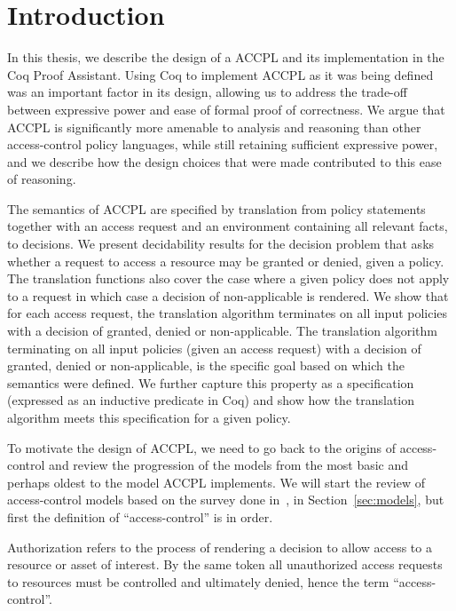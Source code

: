 \chapter{Introduction}
\label{chap:intro}

In this thesis, we describe the design of a \ac{ACCPL} and its implementation in the Coq Proof Assistant. Using Coq to implement \ac{ACCPL} as it was being defined was an important factor in its design, allowing us to address the trade-off between expressive power and ease of formal proof of correctness. We argue that \ac{ACCPL} is significantly more amenable to analysis and reasoning than other access-control policy languages, while still retaining sufficient expressive power, and we describe how the design choices that were made contributed to this ease of reasoning. 

The semantics of \ac{ACCPL} are specified by translation from policy statements together with an access request and an environment containing all relevant facts, to decisions. We present decidability results for the decision problem that asks whether a request to access a resource may be granted or denied, given a policy. The translation functions also cover the case where a given policy does not apply to a request in which case a decision of non-applicable is rendered. We show that for each access request, the translation algorithm terminates on all input policies with a decision of granted, denied or non-applicable. The translation algorithm terminating on all input policies (given an access request) with a decision of granted, denied or non-applicable, is the specific goal based on which the semantics were defined. We further capture this property as a specification (expressed as an inductive predicate in Coq) and show how the translation algorithm meets this specification for a given policy. 

To motivate the design of \ac{ACCPL}, we need to go back to the origins of access-control and review the progression of the models from the most basic and perhaps oldest to the model \ac{ACCPL} implements. We will start the review of access-control models based on the survey done in~\cite{nist}, in Section~\ref{sec:models}, but first the definition of ``access-control'' is in order.

Authorization refers to the process of rendering a decision to allow access to a resource or asset of interest. By the same token all unauthorized access requests to resources must be controlled and ultimately denied, hence the term ``access-control''. 


